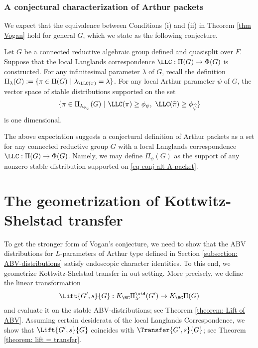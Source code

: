 \documentclass[11pt,letterpaper]{amsart}
\numberwithin{equation}{section}
\begin{document}
\section{A conjectural characterization of Arthur packets}

We expect that the equivalence between Conditions (i) and (ii) in Theorem \ref{thm Vogan} hold for general $G$, which we state as the following conjecture.

\begin{conjecture}\label{conj alt A-packet}
Let $G$ be a connected reductive algebraic group defined and quasisplit over $F$. Suppose that the local Langlands correspondence $\LLC: \Pi(G) \to \Phi(G)$ is constructed. For any infinitesimal parameter $\lambda$ of $G$, recall the definition $\Pi_{\lambda}(G):= \{ \pi \in \Pi(G)\ | \ \lambda_{\LLC(\pi)}= \lambda\}$.
For any local Arthur parameter $\psi$ of $G$, the vector space of stable distributions supported on the set 
\begin{align}\label{eq conj alt A-packet}
    \{\pi \in \Pi_{\lambda_{\phi_{\psi}}}(G)\ | \ \LLC(\pi) \geq \phi_{\psi},\ \LLC(\widehat{\pi}) \geq \phi_{\widehat{\psi}}\}
\end{align}
is one dimensional.
\end{conjecture}
The above expectation suggests a conjectural definition of Arthur packets as a set for any connected reductive group $G$ with a local Langlands correspondence $\LLC: \Pi(G) \to \Phi(G)$. Namely, we may define $\Pi_{\psi}(G)$ as the support of any nonzero stable distribution supported on \eqref{eq conj alt A-packet}. 

\part{The geometrization of Kottwitz-Shelstad transfer}
\label{part: IV Lift}
To get the stronger form of Vogan's conjecture, we need to show that the ABV distributions for $L$-parameters of Arthur type defined in Section \ref{subsection: ABV-distributions} satisfy endoscopic character identities. To this end, we geometrize Kottwitz-Shelstad transfer in out setting. More precisely, we define the linear transformation 
\[\Lift{G',s}{G}: K_{\BC}\Pi_{\lambda'}^{\std}(G') \to K_{\BC}\Pi(G)\]
and evaluate it on the stable ABV-distributions; see Theorem \ref{theorem: Lift of ABV}. Assuming certain desiderata of the local Langlands Correspondence, we show that $\Lift{G',s}{G}$ coincides with $\Transfer{G',s}{G}$; see Theorem \ref{theorem: lift = transfer}.
\end{document}
